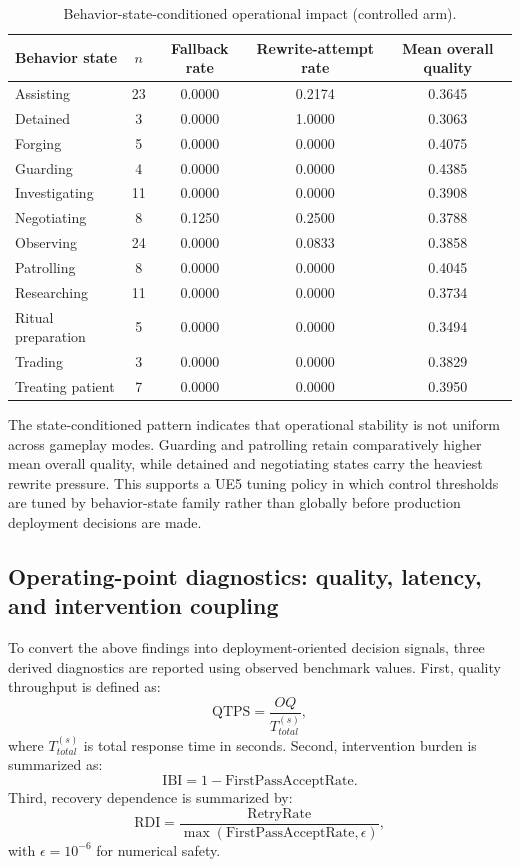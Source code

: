 ﻿\documentclass[a4paper,12pt]{article}
\begin{document}
\begin{table}[t]
\centering
\caption{Behavior-state-conditioned operational impact (controlled arm).}
\label{tab:ue5_state_operational}
\begingroup
\footnotesize
\setlength{\tabcolsep}{4pt}
\begin{tabular}{lcccc}
\toprule
Behavior state & \(n\) & Fallback rate & Rewrite-attempt rate & Mean overall quality \\
\midrule
Assisting & 23 & 0.0000 & 0.2174 & 0.3645 \\
Detained & 3 & 0.0000 & 1.0000 & 0.3063 \\
Forging & 5 & 0.0000 & 0.0000 & 0.4075 \\
Guarding & 4 & 0.0000 & 0.0000 & 0.4385 \\
Investigating & 11 & 0.0000 & 0.0000 & 0.3908 \\
Negotiating & 8 & 0.1250 & 0.2500 & 0.3788 \\
Observing & 24 & 0.0000 & 0.0833 & 0.3858 \\
Patrolling & 8 & 0.0000 & 0.0000 & 0.4045 \\
Researching & 11 & 0.0000 & 0.0000 & 0.3734 \\
Ritual preparation & 5 & 0.0000 & 0.0000 & 0.3494 \\
Trading & 3 & 0.0000 & 0.0000 & 0.3829 \\
Treating patient & 7 & 0.0000 & 0.0000 & 0.3950 \\
\bottomrule
\end{tabular}
\endgroup
\end{table}

The state-conditioned pattern indicates that operational stability is not uniform across gameplay modes. Guarding and patrolling retain comparatively higher mean overall quality, while detained and negotiating states carry the heaviest rewrite pressure. This supports a UE5 tuning policy in which control thresholds are tuned by behavior-state family rather than globally before production deployment decisions are made.

\subsection{Operating-point diagnostics: quality, latency, and intervention coupling}
To convert the above findings into deployment-oriented decision signals, three derived diagnostics are reported using observed benchmark values. First, quality throughput is defined as:
\begin{equation}
\mathrm{QTPS}=\frac{OQ}{T_{total}^{(s)}},
\end{equation}
where \(T_{total}^{(s)}\) is total response time in seconds. Second, intervention burden is summarized as:
\begin{equation}
\mathrm{IBI}=1-\mathrm{FirstPassAcceptRate}.
\end{equation}
Third, recovery dependence is summarized by:
\begin{equation}
\mathrm{RDI}=\frac{\mathrm{RetryRate}}{\max(\mathrm{FirstPassAcceptRate},\epsilon)},
\end{equation}
with \(\epsilon=10^{-6}\) for numerical safety.
\end{document}
